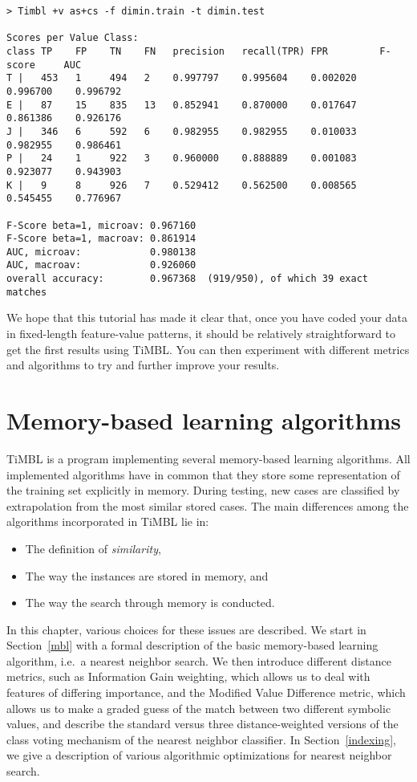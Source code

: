 \documentclass{report}
\begin{document}
{\footnotesize
\begin{verbatim}
> Timbl +v as+cs -f dimin.train -t dimin.test

Scores per Value Class:
class TP    FP    TN    FN   precision   recall(TPR) FPR         F-score     AUC
T |   453   1     494   2    0.997797    0.995604    0.002020    0.996700    0.996792
E |   87    15    835   13   0.852941    0.870000    0.017647    0.861386    0.926176
J |   346   6     592   6    0.982955    0.982955    0.010033    0.982955    0.986461
P |   24    1     922   3    0.960000    0.888889    0.001083    0.923077    0.943903
K |   9     8     926   7    0.529412    0.562500    0.008565    0.545455    0.776967

F-Score beta=1, microav: 0.967160
F-Score beta=1, macroav: 0.861914
AUC, microav:            0.980138
AUC, macroav:            0.926060
overall accuracy:        0.967368  (919/950), of which 39 exact matches 
\end{verbatim}
}

We hope that this tutorial has made it clear that, once you have coded
your data in fixed-length feature-value patterns, it should be
relatively straightforward to get the first results using TiMBL. You
can then experiment with different metrics and algorithms to try and
further improve your results.

\chapter{Memory-based learning algorithms}
\label{algorithms}

TiMBL is a program implementing several memory-based learning
algorithms. All implemented algorithms have in common that they store some
representation of the training set explicitly in memory. During
testing, new cases are classified by extrapolation from the most
similar stored cases. The main differences among the algorithms
incorporated in TiMBL lie in:

\begin{itemize}
\item The definition of {\em similarity},
\item The way the instances are stored in memory, and
\item The way the search through memory is conducted.
\end{itemize}

In this chapter, various choices for these issues are described. We
start in Section~\ref{mbl} with a formal description of the basic
memory-based learning algorithm, i.e.~a nearest neighbor search. We
then introduce different distance metrics, such as Information Gain
weighting, which allows us to deal with features of differing
importance, and the Modified Value Difference metric, which allows us
to make a graded guess of the match between two different symbolic
values, and describe the standard versus three distance-weighted
versions of the class voting mechanism of the nearest neighbor
classifier. In Section~\ref{indexing}, we give a description of
various algorithmic optimizations for nearest neighbor search.
\end{document}
